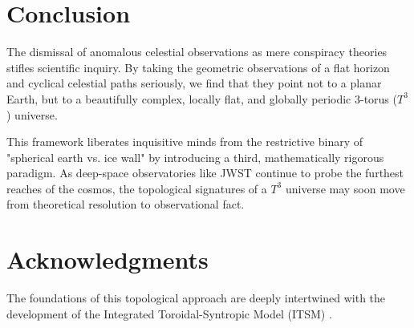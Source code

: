 \documentclass[aps,prd,11pt,onecolumn,superscriptaddress,nofootinbib,floatfix]{revtex4-2}
\begin{document}
\section{Conclusion}
\label{sec:conclusion}

The dismissal of anomalous celestial observations as mere conspiracy theories stifles scientific inquiry. By taking the geometric observations of a flat horizon and cyclical celestial paths seriously, we find that they point not to a planar Earth, but to a beautifully complex, locally flat, and globally periodic 3-torus ($T^3$) universe. 

This framework liberates inquisitive minds from the restrictive binary of "spherical earth vs. ice wall" by introducing a third, mathematically rigorous paradigm. As deep-space observatories like JWST continue to probe the furthest reaches of the cosmos, the topological signatures of a $T^3$ universe may soon move from theoretical resolution to observational fact.

\section*{Acknowledgments}
The foundations of this topological approach are deeply intertwined with the development of the Integrated Toroidal-Syntropic Model (ITSM) \cite{itsm_main}. 




\end{document}
